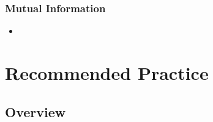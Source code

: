\subsubsection{Mutual Information}
\begin{itemize}
\item
\end{itemize}


\section{Recommended Practice}

\subsection{Overview}
